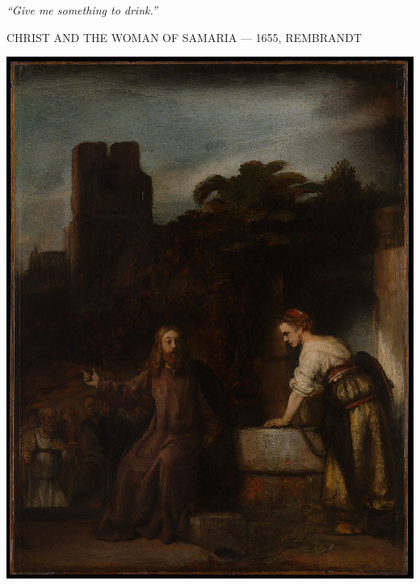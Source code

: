 \clearpage
\thispagestyle{empty}
\null\vfill
\settowidth{}
\begin{center}
\parbox{\longest}{%
  \raggedright{\huge\itshape%
    ``Give me something to drink.'' \par\bigskip
  }
  \raggedleft\Large\MakeUppercase{Christ and the Woman of Samaria — 1655, Rembrandt}\par%
}
\vfill\vfill
\clearpage\newpage
\end{center}
\newpage
\thispagestyle{empty}
\begin{center}
	\includegraphics[width=1\textwidth]{images/illustrations/jesuswomansamaria.jpeg}
\end{center}
\vfill\vfill